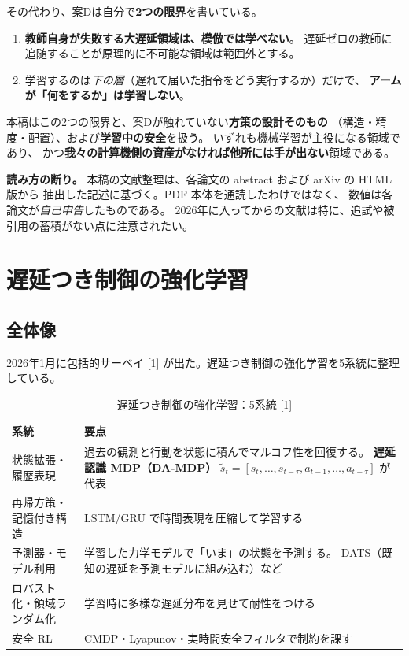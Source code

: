 \documentclass[11pt,a4paper]{article}
\newcommand{\prob}[1]{\textbf{\textcolor{red!55!black}{#1}}}
\newcommand{\keyp}[1]{\textbf{\textcolor{blue!45!black}{#1}}}
\begin{document}
その代わり、案Dは自分で\prob{2つの限界}を書いている。

\begin{enumerate}[leftmargin=1.6em,itemsep=3pt]
  \item \prob{教師自身が失敗する大遅延領域は、模倣では学べない}。
        遅延ゼロの教師に追随することが原理的に不可能な領域は範囲外とする。
  \item 学習するのは\emph{下の層}（遅れて届いた指令をどう実行するか）だけで、
        \prob{アームが「何をするか」は学習しない}。
\end{enumerate}

\noindent
本稿はこの2つの限界と、案Dが触れていない\prob{方策の設計そのもの}
（構造・精度・配置）、および\prob{学習中の安全}を扱う。
いずれも機械学習が主役になる領域であり、
かつ\keyp{我々の計算機側の資産がなければ他所には手が出ない}領域である。

\medskip
\noindent
\textbf{読み方の断り。} 本稿の文献整理は、各論文の abstract および arXiv の HTML 版から
抽出した記述に基づく。PDF 本体を通読したわけではなく、
数値は各論文が\emph{自己申告}したものである。
2026年に入ってからの文献は特に、追試や被引用の蓄積がない点に注意されたい。

\section{遅延つき制御の強化学習}
\label{sec:delayrl}

\subsection{全体像}

2026年1月に包括的サーベイ [1] が出た。遅延つき制御の強化学習を5系統に整理している。

\begin{table}[htbp]
\centering
\small
\caption{遅延つき制御の強化学習：5系統 [1]}
\label{tab:delay5}
\begin{tabularx}{\textwidth}{@{}l X@{}}
\toprule
\textbf{系統} & \textbf{要点} \\
\midrule
状態拡張・履歴表現 & 過去の観測と行動を状態に積んでマルコフ性を回復する。
  \keyp{遅延認識 MDP（DA-MDP）} $\tilde s_t=[s_t,\dots,s_{t-\tau},a_{t-1},\dots,a_{t-\tau}]$ が代表 \\
再帰方策・記憶付き構造 & LSTM/GRU で時間表現を圧縮して学習する \\
予測器・モデル利用 & 学習した力学モデルで「いま」の状態を予測する。
  DATS（既知の遅延を予測モデルに組み込む）など \\
ロバスト化・領域ランダム化 & 学習時に多様な遅延分布を見せて耐性をつける \\
安全 RL & CMDP・Lyapunov・実時間安全フィルタで制約を課す \\
\bottomrule
\end{tabularx}
\end{table}
\end{document}
